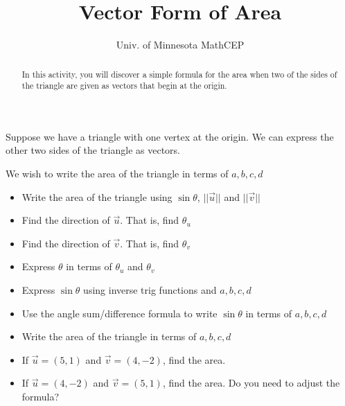 \documentclass[number]{ximera}
\title{Vector Form of Area}
\author{Univ. of Minnesota MathCEP}
\begin{document}
\begin{abstract}
  In this activity, you will discover a simple formula for the area when two of the sides of the triangle are given as vectors that begin at the origin.
\end{abstract}

\maketitle

Suppose we have a triangle with one vertex at the origin. We can express the other two sides of the triangle as vectors.

We wish to write the area of the triangle in terms of $a,b,c,d$

\bigskip


\begin{itemize}

\item Write the area of the triangle using $\sin \theta$, $||\overrightarrow u||$ and $||\overrightarrow v||$

\item Find the direction of $\overrightarrow u$. That is, find $\theta_u$

\item Find the direction of $\overrightarrow v$. That is, find $\theta_v$

\item Express $\theta$ in terms of $\theta_u$ and $\theta_v$

\item Express $\sin \theta$ using inverse trig functions and $a,b,c,d$

\item Use the angle sum/difference formula to write $\sin \theta$ in terms of $a,b,c,d$

\item Write the area of the triangle in terms of $a,b,c,d$

\item If $\overrightarrow u = (5,1)$ and $\overrightarrow v = (4,-2)$, find the area. 

\item If $\overrightarrow u = (4,-2)$ and $\overrightarrow v = (5,1)$, find the area.  Do you need to adjust the formula?

\end{itemize}
\end{document}

